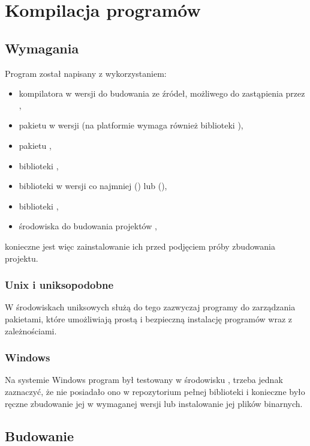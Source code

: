 \documentclass[polish]{standalone}
\begin{document}
\appendix

\chapter{Kompilacja programów}

\section{Wymagania}

Program został napisany z wykorzystaniem:
\begin{itemize}
\item kompilatora  w wersji  do budowania ze źródeł, możliwego do zastąpienia przez  
,
\item pakietu  w wersji  (na platformie  wymaga również biblioteki ),
\item pakietu ,
\item biblioteki ,
\item biblioteki  w wersji co najmniej  () lub  (),
\item biblioteki ,
\item środowiska do budowania projektów ,
\end{itemize}
konieczne jest więc zainstalowanie ich przed podjęciem próby zbudowania projektu.

\subsection{Unix i uniksopodobne}

W środowiskach uniksowych służą do tego zazwyczaj programy do zarządzania pakietami, które umożliwiają prostą
i bezpieczną instalację programów wraz z zależnościami.

\subsection{Windows}

Na systemie Windows program był testowany w środowisku , trzeba jednak zaznaczyć, że nie posiadało ono
w repozytorium pełnej biblioteki  i konieczne było ręczne zbudowanie jej w wymaganej wersji lub instalowanie
jej plików binarnych.

\section{Budowanie}
\end{document}
